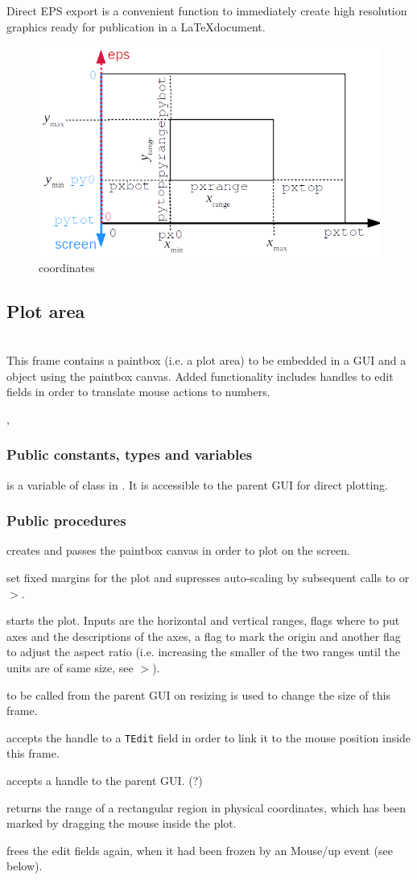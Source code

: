 \documentclass[12pt]{article}
\newcommand\code[1]{{\tt #1}}
\newcommand\guifco[1]{{\color{violet}\code{#1}}}
\newcommand{\unico}[1]{{\color{burntorange}\code{#1}}}
\newcommand{\prcod}[2]{\opauni{#1}$>$\unico{#2}}
\newcommand{\opaguif}[1]{\colorbox{violet!30}{{\color{black}\code{#1}}}}
\newcommand{\oguifh}[2]{\subsection{\label{#2}#1}{\Huge\opaguif{#2}}\\}
\newcommand{\opauni}[1]{\colorbox{orange!30}{{\color{black}\code{#1}}}}
\newcommand{\ouni}[1]{\hyperref[#1]{\opauni{#1}}}
\newcommand{\uses}[1]{\flushleft {\bf Uses:} #1}
\newcommand{\pvar}[1]{\subsubsection*{Public constants, types and variables} #1}
\newcommand{\ppro}[1]{\subsubsection*{Public procedures} #1}
\newcommand{\todo}[1]{{\color{red} #1}}
\newcommand{\feature}[1]{{\color{cadmiumgreen} #1}}
\begin{document}
\feature{Direct EPS export is a convenient function to immediately create high resolution graphics ready for publication in a \LaTeX document.}


\begin{figure}\centering
\includegraphics[scale=0.8]{vplotcoor.png}
\caption{\label{vprange}\ouni{../com/vgraph} coordinates}
\end{figure}



\oguifh{Plot area}{../com/asfigure}
This frame contains a paintbox (i.e. a plot area) to be embedded in a GUI and a \unico{Vplot} object using the paintbox canvas. 
Added functionality includes handles to edit fields in order to translate mouse actions to numbers. 

\uses{\ouni{../com/vgraph}, \ouni{../com/asaux}}

\pvar{
\guifco{plot} is a variable of class \unico{Vplot} in \ouni{../com/vgraph}. It is accessible to the parent GUI for direct plotting.

}

\ppro{

\guifco{assignScreen} creates \unico{Vplot} and passes the paintbox canvas in order to plot on the screen.

\guifco{forceMargin*} set fixed margins for the plot and supresses auto-scaling by subsequent calls to \guifco{Init} or \prcod{vgraph}{Axis}.

\guifco{Init} starts the plot. Inputs are the horizontal and vertical ranges, flags where to put axes and the descriptions of the axes, a flag to mark the origin and another flag to adjust the aspect ratio (i.e. increasing the smaller of the two ranges until the units are of same size, see \prcod{vgraph}{AdjustAspectRatio}).

\guifco{SetSize} to be called from the parent GUI on resizing is used to change the size of this frame.

\guifco{PassEditHandle*} accepts the handle to a \code{TEdit} field in order to link it to the mouse position inside this frame.

\guifco{PassFormHandle} accepts a handle to the parent GUI. \todo{(?)}

\guifco{GetRange} returns the range of a rectangular region in physical coordinates, which has been marked by dragging the mouse inside the plot.

\guifco{UnfreezeEdit} frees the edit fields again, when it had been frozen by an Mouse/up event (see below).
}
\end{document}
